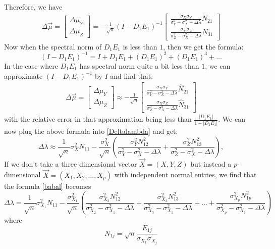 \documentclass[12pt]{amsart}
\theoremstyle{definition}
\numberwithin{equation}{section}
\numberwithin{equation}{section}
\theoremstyle{remark}
\numberwithin{equation}{section}
\begin{document}
Therefore, we have
\begin{align}
\Delta\vec{\mu}=
\left[
\begin{array}{c}
\Delta\mu_Y\\
\Delta\mu_Z
\end{array}\right]= -\frac{1}{\sqrt{n}}(I-D_1E_1)^{-1}
\left[
\begin{array}{c}
\frac{\sigma_X\sigma_Y}{\sigma_Y^2-\sigma_X^2-\Delta\lambda}N_{21}\\
\frac{\sigma_X\sigma_Z}{\sigma_Z^2-\sigma_X^2-\Delta\lambda}N_{31}
\end{array}
\right]
\end{align}
Now when the spectral norm of $D_1E_1$ is less than $1$, then we get the formula:
$$(I-D_1E_1)^{-1}=I+D_1E_1+(D_1E_1)^2+(D_1E_1)^3+\ldots$$
In the case where $D_1E_1$ has spectral norm quite a bit less than $1$, we can approximate $(I-D_1E_1)^{-1}$  by $I$ and find that:
\begin{align*}
\Delta\vec{\mu}=
\left[
\begin{array}{c}
\Delta\mu_Y\\
\Delta\mu_Z
\end{array}\right]
\approx -\frac{1}{\sqrt{n}}
\left[
\begin{array}{c}
\frac{\sigma_X\sigma_Y}{\sigma_Y^2-\sigma_X^2-\Delta\lambda}\hat{N}_{21}\\
\frac{\sigma_X\sigma_Z}{\sigma_Z^2-\sigma_X^2-\Delta\lambda}\hat{N}_{31}
\end{array}
\right]
\end{align*}
with the relative error in that approximation being less than $\frac{|D_1E_1|}{1-|D_1E_1|}$. We can now plug the above formula into \ref{Deltalambda} and get:
\begin{equation}
\label{babal}
\Delta\lambda\approx \frac{1}{\sqrt{n}}\sigma^{2}_{X} N_{11}
-\frac{\sigma^{2}_X}{\sqrt{n}}(\frac{\sigma_Y^2 N_{12}^2}{\sigma_Y^2-\sigma_X^2-\Delta\lambda}+
\frac{\sigma_Z^2 N_{13}^2}{\sigma_Z^2-\sigma_X^2-\Delta\lambda}),
\end{equation}
If we don't take a three dimensional vector $\vec{X}=(X,Y,Z)$ but instead a $p$-dimensional $\vec{X}=(X_1,X_2,\ldots,X_p)$ with independent normal entries, we find that the formula \ref{babal} becomes
\begin{equation}
\label{babal2}
\Delta\lambda= \frac{1}{\sqrt{n}}\sigma^{2}_{X_1} N_{11}
- \frac{\sigma _{X_1}^2}{\sqrt{n}}\left(\frac{\sigma_{X_2}^2 N_{12}^2}{\sigma_{X_2}^2-\sigma_{X_1}^2-\Delta\lambda}+
\frac{\sigma_{X_3}^2 N_{13}^2}{\sigma_{X_3}^2-\sigma_{X_1}^2-\Delta\lambda}+
\ldots+
\frac{\sigma_{X_p}^2 N_{1p}^2}{\sigma_{X_p}^2-\sigma_{X_1}^2-\Delta\lambda}\right)
\end{equation}
where $$N_{1j}=\sqrt{n}\frac{E_{1j}}{\sigma_{X_1}\sigma_{X_j}}$$
\end{document}
